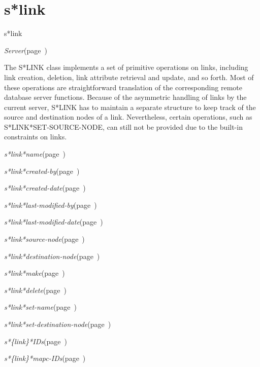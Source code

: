 \section{s*link}
\label{s*link}

\begin{description}
\item [Name:]  s*link

\item [Layer:] {\sl Server}\hfill(page~\pageref{Server})

\item [Description:]
The S*LINK class implements a set of primitive
operations on links, including link creation, deletion,
link attribute retrieval and update, and so forth.
Most of these operations are straightforward
translation of the corresponding remote database server
functions. Because of the asymmetric handling of links
by the current server, S*LINK has to maintain a
separate structure to keep track of the source and
destination nodes of a link. Nevertheless, certain
operations, such as S*LINK*SET-SOURCE-NODE, can still
not be provided due to the built-in constraints on
links.

\item [Attributes:]
\item {\sl s*link*name}\hfill(page~\pageref{s*link*name})
\item {\sl s*link*created-by}\hfill(page~\pageref{s*link*created-by})
\item {\sl s*link*created-date}\hfill(page~\pageref{s*link*created-date})
\item {\sl s*link*last-modified-by}\hfill(page~\pageref{s*link*last-modified-by})
\item {\sl s*link*last-modified-date}\hfill(page~\pageref{s*link*last-modified-date})
\item {\sl s*link*source-node}\hfill(page~\pageref{s*link*source-node})
\item {\sl s*link*destination-node}\hfill(page~\pageref{s*link*destination-node})

\item [Operations:]
\item {\sl s*link*make}\hfill(page~\pageref{s*link*make})
\item {\sl s*link*delete}\hfill(page~\pageref{s*link*delete})
\item {\sl s*link*set-name}\hfill(page~\pageref{s*link*set-name})
\item {\sl s*link*set-destination-node}\hfill(page~\pageref{s*link*set-destination-node})

\item {\sl s*\{link\}*IDs}\hfill(page~\pageref{s*link*IDs})
\item {\sl s*\{link\}*mapc-IDs}\hfill(page~\pageref{s*link*mapc-IDs})

\item [Collections:]

\item [Subclasses:]

\item [Superclasses:]



\end{description}
\horizontalline

